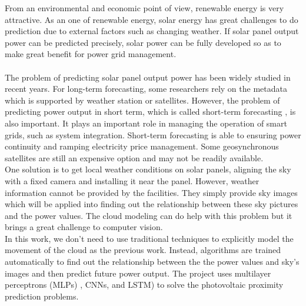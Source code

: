 From an environmental and economic point of view, renewable energy is very attractive. As an one of renewable energy, solar energy has great challenges to do prediction due to external factors such as changing weather.\cite{schweiger2017understanding} If  solar panel output power can be predicted precisely,  solar power can be fully developed so as to make great benefit for power grid management.\cite{wan2015photovoltaic} \\[2ex]
\\
	The problem of predicting solar panel output power has been widely studied in recent years. For  long-term forecasting, some researchers rely on the metadata which is supported by weather station or satellites.\cite{deo2017forecasting} 
	 However, the problem of predicting power output in short term, which is called short-term forecasting , is also important. It plays an important role  in managing the operation of smart grids, such as system integration. Short-term forecasting is able to ensuring power continuity and ramping electricity price management.\cite{antonanzas2016review} Some geosynchronous satellites are still an expensive option and may not be readily available.\\[2ex]
	 One solution is to get local weather conditions on solar panels, aligning the sky with a fixed camera and installing it near the panel.\cite{yang2014solar} However,  weather information cannot be provided by the facilities.  
	 They simply provide sky images which will be applied into finding out the relationship between these sky pictures and the power values. The cloud modeling can do help with this problem but it brings a great challenge to computer vision.\cite{fathi2015automated} \\[2ex]
	 In this work, we don't need to use traditional  techniques to explicitly model the movement of the cloud as the previous work. Instead,  algorithms are trained  automatically to find out the relationship between the the power values and sky's images and then predict future power output. The project uses multilayer perceptrons (MLPs) , CNNs, and LSTM)  to solve the photovoltaic proximity prediction problems.\\[2ex]








